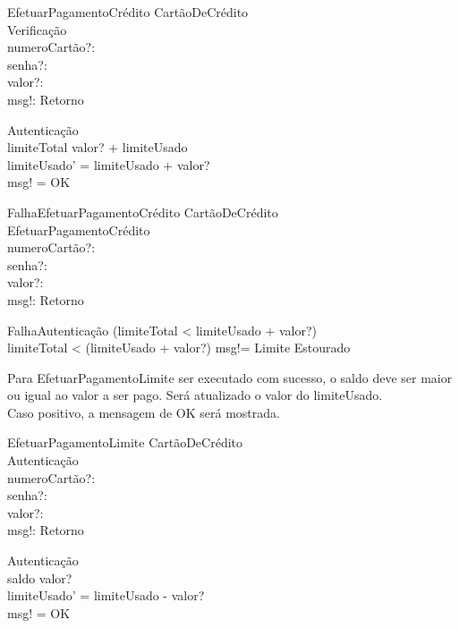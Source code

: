 \documentclass{article}
\begin{document}
\begin{schema}{EfetuarPagamentoCrédito}
    \Delta CartãoDeCrédito\\
    \Xi Verificação\\
    numeroCartão?: \nat\\
    senha?: \nat\\
    valor?: \real\\
    msg!: Retorno

    \where
    \Xi Autenticação\\
    limiteTotal \geq valor? + limiteUsado\\
    limiteUsado' = limiteUsado + valor?\\
    msg! = OK
    
\end{schema}

\begin{schema}{FalhaEfetuarPagamentoCrédito}
    \Xi CartãoDeCrédito\\
    \Xi EfetuarPagamentoCrédito\\
    numeroCartão?: \nat\\
    senha?: \nat\\
    valor?: \real\\
    msg!: Retorno

    \where
    \Xi FalhaAutenticação \lor (limiteTotal < limiteUsado + valor?) \\
    \IF limiteTotal < (limiteUsado + valor?) \THEN msg!= Limite Estourado
    
\end{schema}

\pagebreak

Para EfetuarPagamentoLimite ser executado com sucesso, o saldo deve ser maior ou igual ao valor a ser pago. Será atualizado o valor do limiteUsado.\\
Caso positivo, a mensagem de OK será mostrada.

\begin{schema}{EfetuarPagamentoLimite}
    \Delta CartãoDeCrédito\\
    \Xi Autenticação\\
    numeroCartão?: \nat\\
    senha?: \nat\\
    valor?: \real\\
    msg!: Retorno

    \where
    \Xi Autenticação\\
    saldo \geq valor?\\
    limiteUsado' = limiteUsado - valor?\\
    msg! = OK
    
\end{schema}
\end{document}
